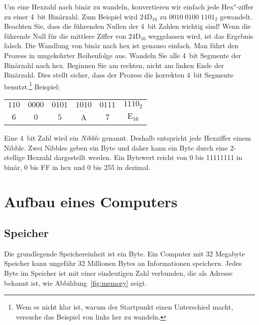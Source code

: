 Um eine Hexzahl nach bin\"{a}r zu wandeln, konvertieren wir einfach jede
Hex"-ziffer zu einer 4~bit Bin\"{a}rzahl. Zum Beispiel wird
$\mathrm{24D}_{16}$ zu \mbox{$0010\;0100\; 1101_2$} gewandelt.
Beachten Sie, dass die f\"{u}hrenden Nullen der 4~bit Zahlen wichtig
sind! Wenn die f\"{u}hrende Null f\"{u}r die mittlere Ziffer von
$\mathrm{24D}_{16}$ weggelassen wird, ist das Ergebnis falsch. Die
Wandlung von bin\"{a}r nach hex ist genauso einfach. Man f\"{u}hrt den
Prozess in umgekehrter Reihenfolge aus. Wandeln Sie alle 4~bit
Segmente der Bin\"{a}rzahl nach hex. Beginnen Sie am rechten, nicht am
linken Ende der Bin\"{a}rzahl. Dies stellt sicher, dass der Prozess die
korrekten 4~bit Segmente benutzt.\footnote{Wem es nicht klar ist,
warum der Startpunkt einen Unterschied macht, versuche das Beispiel
von links her zu wandeln.} Beispiel:\newline

\begin{center}
\begin{tabular}{cccccc}
 $110$ & $0000$ & $0101$ & $1010$ & $0111$ & $1110_2$ \\
   $6$ & $0$    &   $5$  &   A  &  $7$   &    $\mathrm{E}_{16}$ \\
\end{tabular}\newline
\end{center}

Eine 4~bit Zahl wird ein \emph{Nibble}  genannt.
Deshalb entspricht jede Hexziffer einem Nibble. Zwei Nibbles geben
ein Byte und daher kann ein Byte durch eine 2-stellige Hexzahl
dargestellt werden. Ein Bytewert reicht von 0 bis 11111111 in bin\"{a}r,
0 bis FF in hex und 0 bis 255 in dezimal. 

\section{Aufbau eines Computers}

\subsection{Speicher }

Die grundlegende Speichereinheit ist ein Byte. 
 Ein Computer mit 32 Megabyte Speicher kann ungef\"{a}hr 32
Millionen Bytes an Informationen speichern. Jedes Byte im Speicher
ist mit einer eindeutigen Zahl verbunden, die als Adresse bekannt
ist, wie Abbildung~\ref{fig:memory} zeigt.

